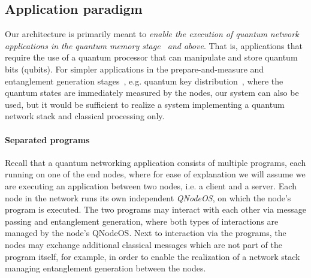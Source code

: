 \begin{figure}[tp]
    \label{qnodeos:fig:network_nodes}
\end{figure}

\subsection{Application paradigm}
\label{qnodeos:sec:design-consid:challenges:application}

Our architecture is primarily meant to \emph{enable the execution of quantum network applications in the quantum memory stage~\cite{wehner_2018_stages} and above}. That is, applications that require the use of a quantum processor that can manipulate and store quantum bits (qubits). For simpler applications in the prepare-and-measure and entanglement generation stages~\cite{wehner_2018_stages}, e.g. quantum key distribution~\cite{bb84Original,ekert_1991_e91}, where the quantum states are immediately measured by the nodes, our system can also be used, but it would be sufficient to realize a system implementing a quantum network stack and classical processing only.

\paragraph{Separated programs}

Recall that a quantum networking application consists of multiple programs, each running on one of the end nodes, where for ease of explanation we will assume we are executing an application between two nodes, i.e. a client and a server. Each node in the network runs its own independent \emph{\ac{QNodeOS}}, on which the node's program is executed. The two programs may interact with each other via message passing and entanglement generation, where both types of interactions are managed by the node's \ac{QNodeOS}. Next to interaction via the programs, the nodes may exchange additional classical messages which are not part of the program itself, for example, in order to enable the realization of a network stack~\cite{dahlberg_2019_egp} managing entanglement generation between the nodes.


